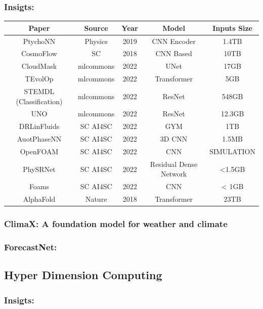 \documentclass[8pt,UTF8]{article}
\begin{document}
        \subsubsection{Insigts:}
            \begin{tabular}{||c c c c c||} 
                \hline
                Paper & Source&Year& Model & Inputs Size \\ [0.5ex] 
                \hline\hline
                PtychoNN & Physics & 2019 & CNN Encoder &  1.4TB \\
                CosmoFlow & SC & 2018 & CNN Based & 10TB \\
                CloudMask & mlcommons & 2022 & UNet & 17GB \\
                TEvolOp & mlcommons & 2022 & Transformer & 5GB \\
                STEMDL (Classification) & mlcommons & 2022 & ResNet & 548GB \\
                UNO & mlcommons & 2022 & ResNet & 12.3GB \\
                DRLinFluids & SC AI4SC & 2022 & GYM & 1TB\\
                AuotPhaseNN & SC AI4SC & 2022 & 3D CNN & 1.5MB\\
                OpenFOAM & SC AI4SC & 2022 & CNN & SIMULATION\\
                PhySRNet& SC AI4SC & 2022 & Residual Dense Network & <1.5GB\\
                Foams & SC AI4SC & 2022 & CNN & < 1GB\\
                AlphaFold & Nature & 2018 & Transformer & 23TB \\
                \hline
            \end{tabular}
        \subsubsection{ClimaX: A foundation model for weather and climate}
        \subsubsection{ForecastNet: }
    
    \subsection{Hyper Dimension Computing}
        \subsubsection{Insigts:}
\end{document}
